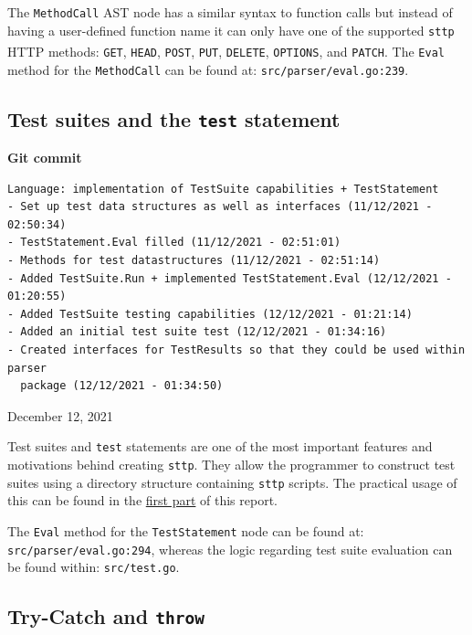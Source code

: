 \documentclass[]{full}
\theoremstyle{definition}
\begin{document}
The \verb|MethodCall| AST node has a similar syntax to function calls but instead of having a user-defined function name it can only have one of the supported \verb|sttp| HTTP methods\textsuperscript{\cite{http_request_methods}}: \verb|GET|, \verb|HEAD|, \verb|POST|, \verb|PUT|, \verb|DELETE|, \verb|OPTIONS|, and \verb|PATCH|. The \verb|Eval| method for the \verb|MethodCall| can be found at: \verb|src/parser/eval.go:239|.

\cprotect\subsection{Test suites and the \verb|test| statement}

\begin{center}
    \textbf{Git commit}
    \begin{verbatim}
Language: implementation of TestSuite capabilities + TestStatement
- Set up test data structures as well as interfaces (11/12/2021 - 02:50:34)
- TestStatement.Eval filled (11/12/2021 - 02:51:01)
- Methods for test datastructures (11/12/2021 - 02:51:14)
- Added TestSuite.Run + implemented TestStatement.Eval (12/12/2021 - 01:20:55)
- Added TestSuite testing capabilities (12/12/2021 - 01:21:14)
- Added an initial test suite test (12/12/2021 - 01:34:16)
- Created interfaces for TestResults so that they could be used within parser
  package (12/12/2021 - 01:34:50)
    \end{verbatim}
    \vspace{-1em}
    \tiny{December 12, 2021}
\end{center}

Test suites and \verb|test| statements are one of the most important features and motivations behind creating \verb|sttp|. They allow the programmer to construct test suites using a directory structure containing \verb|sttp| scripts. The practical usage of this can be found in the \hyperref[sec:hello-sttp-using-sttp-to-test]{first part} of this report.

The \verb|Eval| method for the \verb|TestStatement| node can be found at: \verb|src/parser/eval.go:294|, whereas the logic regarding test suite evaluation can be found within: \verb|src/test.go|.

\cprotect\subsection{Try-Catch and \verb|throw|}
\end{document}
